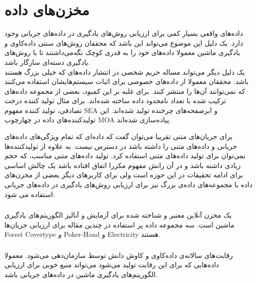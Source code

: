 \section{مخزن‌های داده}
داده‌های واقعی بسیار کمی برای ارزیابی روش‌های یادگیری در داده‌های جریانی وجود دارد\cite{Nguyen2015}. یک دلیل این ‌موضوع می‌تواند این باشد که محققان روش‌های سنتی داده‌کاوی و یادگیری ماشین معمولا داده‌های خود را به قدری کوچک نگه‌می‌داشتند تا با روش‌های یادگیری دسته‌ای
سازگار باشد.
\\

 یک دلیل دیگر می‌تواند مساله حریم شخصی در انتشار داده‌های که خیلی بزرگ هستند باشد. محققان معمولا از داده‌های خصوصی برای اثبات سیستم‌هایشان استفاده می‌کنند که نمی‌توانند آن‌ها را منتشر کنند. برای غلبه بر این کمبود، بعضی از مجموعه داده‌های ترکیب شده با تعداد نامحدود داده ساخته شده‌اند. برای مثال تولید کننده ‌درخت تصادفی، تولید‌ کننده مفهوم SEA و ابرصفحه‌های چرخنده تولید شده‌اند. این تولیدکننده‌های داده در چهارچوب MOA پیاده‌سازی شده‌اند\cite{bifet2010moa}.
 
 
برای جریان‌های متنی تقریبا می‌توان گفت که داده‌ای که تمام ویژگی‌های داده‌های جریانی و داده‌های متنی را داشته باشد در دسترس نیست. به علاوه از تولید‌کننده‌ها نمی‌توان برای تولید داده‌های متنی استفاده کرد. تولید داده‌های متنی مناسب، که حجم زیادی داشته‌ باشد و در آن رانش مفهوم مکررا اتفاق افتاده باشد یک چالش اساسی برای ادامه تحقیقات در این حوزه است ولی برای کاربرهای دیگر بعضی از مخزن‌های داده با مجموعه‌های داده‌ی بزرگ نیز برای ارزیابی روش‌های یادگیری در داده‌های جریانی استفاده می شود:
\subsubsection{}
یک مخزن آنلاین معتبر  و شناخته شده برای آزمایش و آنالیز الگوریتم‌های یادگیری ماشین است. سه مجموعه داده پر استفاده در چندین مقاله برای ارزیابی جریان‌ها Forest Covertype و Poker-Hand و Electricity هستند\cite{Nguyen2015}.
\subsubsection{}
رقابت‌های سالانه‌ی داده‌کاوی و کاوش دانش توسط
سازمان‌دهی می‌شود. معمولا داده‌هایی که برای این رقابت تولید می‌شود می‌تواند منبع خوبی برای ارزیابی الگوریتم‌های یادگیری ماشین در داده‌های جریانی باشد.
